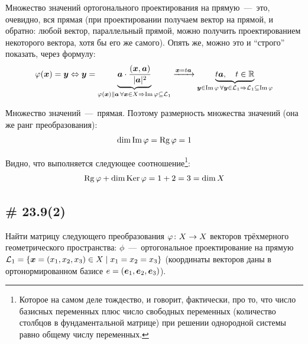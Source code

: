 \documentclass[a4paper,12pt]{article}
\DeclareMathOperator{\Image}{Im}
\DeclareMathOperator{\Imag}{Im}
\begin{document}
\begin{solution}
  Множество значений ортогонального проектирования на прямую~---~это, очевидно, вся прямая (при проектировании получаем вектор на прямой, и обратно: любой вектор, параллельный прямой, можно получить проектированием некоторого вектора, хотя бы его же самого).
  Опять же, можно это и ``строго'' показать, через формулу:
  \[
    \phi(\bds x) = \bds y \Leftrightarrow \bds y = \underbrace{\bds a \cdot \frac{(\bds x, \bds a)}{|\bds a|^2}}_{\phi(\bds x) \parallel \bds a\, \forall \bds x \in X \Rightarrow \Imag \phi \subseteq \mathcal L_1} \xrightarrow{\bds x = t \bds a} \underbrace{t \bds a,\quad t \in \RR}_{\bds y \in \Imag\phi\, \forall \bds y \in \mathcal L_1 \Rightarrow \mathcal L_1 \subseteq \Imag \phi}
  \]
  
  Множество значений~---~прямая.
  Поэтому размерность множества значений (она же ранг преобразования):
  \[
    \dim\Image\phi = \Rg\phi = 1
  \]
  
  Видно, что выполняется следующее соотношение\footnote{Которое на самом деле тождество, и говорит, фактически, про то, что число базисных переменных плюс число свободных переменных (количество столбцов в фундаментальной матрице) при решении однородной системы равно общему числу переменных.}:
  \[
    \operatorname{Rg}\varphi + \dim\operatorname{Ker}\varphi = 1 + 2 = 3 = \dim X
  \]
  \end{solution}
  
  
  \subsection{\# 23.9(2)}
  
  Найти матрицу следующего преобразования $\phi \colon X \hm\to X$ векторов трёхмерного геометрического пространства:
  $\phi$~---~ортогональное проектирование на прямую $\mathcal L_1 \hm= \{\bds x \hm= (x_1, x_2, x_3) \hm\in X \hm\mid x_1 \hm= x_2 \hm= x_3\}$ (координаты векторов даны в ортонормированном базисе $e \hm= (\bds e_1, \bds e_2, \bds e_3)$).
  
  
\end{document}
